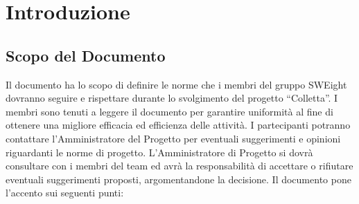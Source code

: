 \section{Introduzione}
\subsection{Scopo del Documento}
Il documento ha lo scopo di definire le norme che i membri del gruppo SWEight dovranno seguire e rispettare durante lo svolgimento del progetto “Colletta”. 
I membri sono tenuti a leggere il documento per garantire uniformità al fine di ottenere una migliore efficacia ed efficienza delle attività. I partecipanti potranno contattare l'Amministratore del Progetto per eventuali suggerimenti e opinioni riguardanti le norme di progetto. 
L'Amministratore di Progetto si dovrà consultare con i membri del team ed avrà la responsabilità di accettare o rifiutare eventuali suggerimenti proposti, argomentandone la decisione.
Il documento pone l'accento sui seguenti punti:

